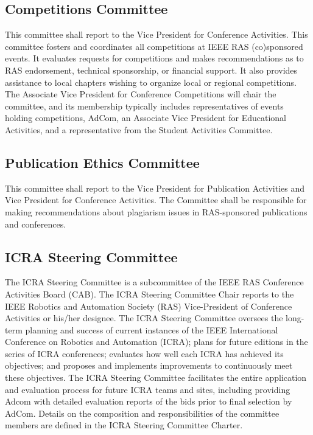\documentclass[10pt]{article}
\begin{document}
\subsection{Competitions Committee}
This committee shall report to the Vice President for Conference Activities. This committee fosters and coordinates all competitions at IEEE RAS (co)sponsored events.  It evaluates requests for competitions and makes recommendations as to RAS endorsement, technical sponsorship, or financial support.  It also provides assistance to local chapters wishing to organize local or regional competitions. The Associate Vice President for Conference Competitions will chair the committee, and its membership typically includes representatives of events holding competitions, AdCom, an Associate Vice President for Educational Activities, and a representative from the Student Activities Committee.



\subsection{Publication Ethics Committee}

This committee shall report to the Vice President for Publication Activities and Vice President for Conference Activities. The Committee shall be responsible for making recommendations about plagiarism issues in RAS-sponsored publications and conferences.


\subsection{ICRA Steering Committee}

The ICRA Steering Committee is a subcommittee of the IEEE RAS Conference Activities Board (CAB). The ICRA Steering Committee Chair reports to the IEEE Robotics and Automation Society (RAS) Vice-President of Conference Activities or his/her designee. The ICRA Steering Committee oversees the long-term planning and success of current instances of the IEEE International Conference on Robotics and Automation (ICRA); plans for future editions in the series of ICRA conferences; evaluates how well each ICRA has achieved its objectives; and proposes and implements improvements to continuously meet these objectives. The ICRA Steering Committee facilitates the entire application and evaluation process for future ICRA teams and sites, including providing Adcom with detailed evaluation reports of the bids prior to final selection by AdCom. Details on the composition and responsibilities of the committee members are defined in the ICRA Steering Committee Charter.
\end{document}

